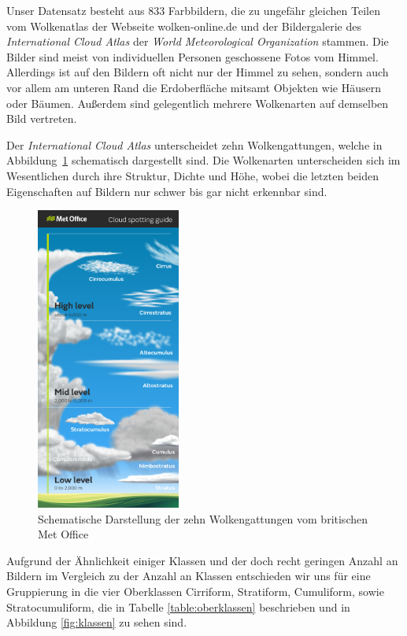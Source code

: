 \documentclass[a4,german]{article}
\begin{document}
Unser Datensatz besteht aus 833 Farbbildern, die zu ungefähr gleichen Teilen vom Wolkenatlas der Webseite wolken-online.de \cite{wolkenonline} und der Bildergalerie des \emph{International Cloud Atlas} der \emph{World Meteorological Organization} \cite{wmo:images} stammen.
Die Bilder sind meist von individuellen Personen geschossene Fotos vom Himmel.
Allerdings ist auf den Bildern oft nicht nur der Himmel zu sehen, sondern auch vor allem am unteren Rand die Erdoberfläche mitsamt Objekten wie Häusern oder Bäumen.
Außerdem sind gelegentlich mehrere Wolkenarten auf demselben Bild vertreten.

Der \textit{International Cloud Atlas}\cite{internationalCloudAtlas} unterscheidet zehn Wolkengattungen, welche in Abbildung~\ref{fig:cloudtypes} schematisch dargestellt sind.
Die Wolkenarten unterscheiden sich im Wesentlichen durch ihre Struktur, Dichte und Höhe, wobei die letzten beiden Eigenschaften auf Bildern nur schwer bis gar nicht erkennbar sind.

\begin{figure}[h!]
\centering
\includegraphics[height=10cm,keepaspectratio]{Cloud_infographic-01.png}
\caption{Schematische Darstellung der zehn Wolkengattungen vom britischen Met Office\cite{metoffice}}
    \label{fig:cloudtypes}
\end{figure}

Aufgrund der Ähnlichkeit einiger Klassen und der doch recht geringen Anzahl an Bildern im Vergleich zu der Anzahl an Klassen entschieden wir uns für eine Gruppierung in die vier Oberklassen \glqq Cirriform\grqq, \glqq Stratiform\grqq, \glqq Cumuliform\grqq, sowie \glqq Stratocumuliform\grqq, die in Tabelle \ref{table:oberklassen} beschrieben und in Abbildung \ref{fig:klassen} zu sehen sind.
\end{document}
